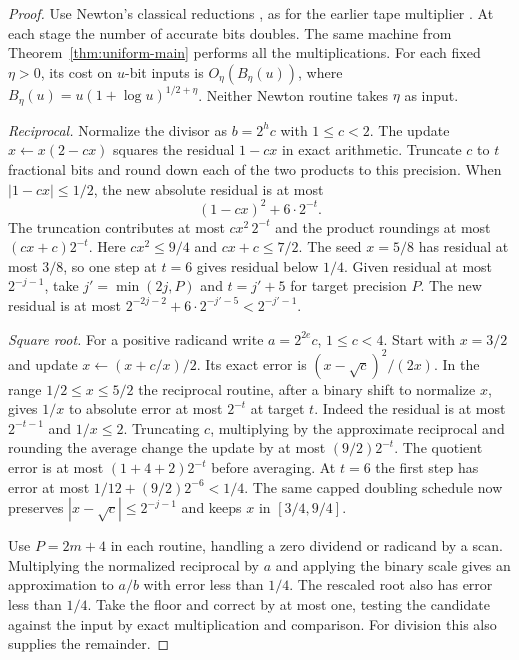 \begin{proof}
Use Newton's classical reductions \cite{Brent1976}, as for the
earlier tape multiplier \cite[Section~10 and Corollary~2]{Tape}.
At each stage the number of accurate bits doubles. The same
machine from Theorem~\ref{thm:uniform-main} performs all the
multiplications. For each fixed $\eta>0$, its cost on $u$-bit
inputs is $O_\eta(B_\eta(u))$, where
$B_\eta(u)=u(1+\log u)^{1/2+\eta}$. Neither Newton routine
takes $\eta$ as input.

\emph{Reciprocal.} Normalize the divisor as $b=2^h c$ with
$1\le c<2$. The update $x\gets x(2-cx)$ squares the residual
$1-cx$ in exact arithmetic. Truncate $c$ to $t$ fractional bits
and round down each of the two products to this precision. When
$|1-cx|\le1/2$, the new absolute residual is at most
\[
                       (1-cx)^2+6\cdot2^{-t}.
\]
The truncation contributes at most $cx^2\,2^{-t}$ and the product
roundings at most $(cx+c)2^{-t}$. Here $cx^2\le9/4$ and
$cx+c\le7/2$. The seed $x=5/8$ has residual at most $3/8$,
so one step at $t=6$ gives residual below $1/4$. Given residual
at most $2^{-j-1}$, take $j'=\min(2j,P)$ and $t=j'+5$ for target
precision $P$. The new residual is at most
$2^{-2j-2}+6\cdot2^{-j'-5}<2^{-j'-1}$.

\emph{Square root.} For a positive radicand write $a=2^{2e}c$,
$1\le c<4$. Start with $x=3/2$ and update $x\gets(x+c/x)/2$.
Its exact error is $(x-\sqrt c)^2/(2x)$. In the range
$1/2\le x\le5/2$ the reciprocal routine, after a binary shift
to normalize $x$, gives $1/x$ to absolute error at most $2^{-t}$
at target $t$. Indeed the residual is at most $2^{-t-1}$ and
$1/x\le2$. Truncating $c$, multiplying by the approximate
reciprocal and rounding the average change the update by at most
$(9/2)2^{-t}$. The quotient error is at most $(1+4+2)2^{-t}$
before averaging. At $t=6$ the first step has error at most
$1/12+(9/2)2^{-6}<1/4$. The same capped doubling schedule now
preserves $|x-\sqrt c|\le2^{-j-1}$ and keeps $x$ in $[3/4,9/4]$.

Use $P=2m+4$ in each routine, handling a zero dividend or
radicand by a scan. Multiplying the normalized reciprocal by $a$
and applying the binary scale gives an approximation to $a/b$
with error less than $1/4$. The rescaled root also has error
less than $1/4$. Take the floor and correct by at most one,
testing the candidate against the input by exact multiplication
and comparison. For division this also supplies the remainder.


\end{proof}
